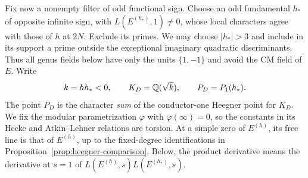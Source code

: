 Fix now a nonempty filter of odd functional sign.  Choose an odd fundamental
$h_*$ of opposite infinite sign, with $L(E^{(h_*)},1)\ne0$, whose local
characters agree with those of $h$ at $2N$.  Exclude its primes.  We may
choose $|h_*|>3$ and include in its support a prime outside the
exceptional imaginary quadratic discriminants.  Thus all genus fields
below have only the units $\{1,-1\}$ and avoid the CM field of $E$.
Write
\[
          k=hh_*<0,\qquad K_D=\mathbb Q(\sqrt{k}),\qquad
          P_D=P_1(h_*).
\]
The point $P_D$ is the character \emph{sum} of the conductor-one Heegner
point for $K_D$. We fix the modular parametrization $\varphi$ with
$\varphi(\infty)=0$, so the constants in its Hecke and Atkin--Lehner
relations are torsion.  At a simple zero of $E^{(h)}$, its free line is that of
$E^{(h)}$, up to the fixed-degree identifications in
Proposition~\ref{prop:heegner-comparison}.
Below, the product derivative means the derivative at $s=1$ of
$L(E^{(h)},s)L(E^{(h_*)},s)$.

